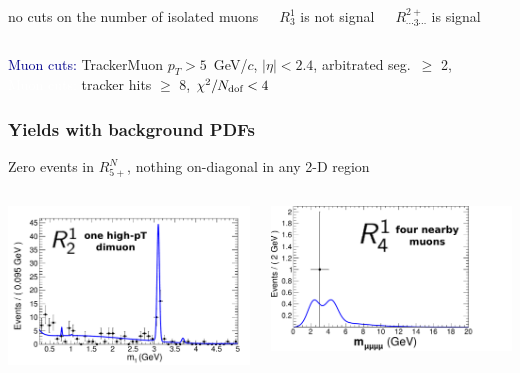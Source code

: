 \documentclass[compress]{beamer}
\newcommand{\s}[1]{{\mbox{\scriptsize #1}}}
\begin{document}
\begin{frame}
\begin{columns}
\centering \scriptsize no cuts on the number of isolated muons

\vspace{0.3 cm} $R^1_3$ is not signal

\vspace{0.2 cm} $R^{2+}_{\cdots 3 \cdots}$ is signal
\end{columns}

\vspace{0.45 cm}
\textcolor{darkblue}{Muon cuts:} TrackerMuon $p_T > 5$~GeV/$c$, $|\eta| < 2.4$, arbitrated seg.\ $\ge$ 2, \\
\textcolor{white}{Muon cuts:} tracker hits $\ge$ 8, $\chi^2/N_\s{dof} < 4$
\end{frame}

\begin{frame}
\frametitle{Yields with background PDFs}

Zero events in $R^N_{5+}$, nothing on-diagonal in any 2-D region

\begin{columns}
\includegraphics[width=\linewidth]{signal_a1_data-bkgpdf.pdf}

\includegraphics[width=\linewidth]{model_data_a2_m_inv_w2.pdf}
\end{columns}


\end{frame}
\end{document}
